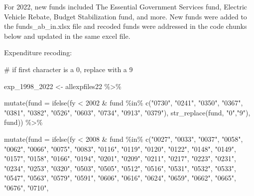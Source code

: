 \documentclass[
  letterpaper,
  DIV=11,
  numbers=noendperiod]{scrreport}
\newenvironment{Shaded}{\begin{snugshade}}{\end{snugshade}}
\newcommand{\AttributeTok}[1]{\textcolor[rgb]{0.40,0.45,0.13}{#1}}
\newcommand{\CommentTok}[1]{\textcolor[rgb]{0.37,0.37,0.37}{#1}}
\newcommand{\DecValTok}[1]{\textcolor[rgb]{0.68,0.00,0.00}{#1}}
\newcommand{\FunctionTok}[1]{\textcolor[rgb]{0.28,0.35,0.67}{#1}}
\newcommand{\NormalTok}[1]{\textcolor[rgb]{0.00,0.23,0.31}{#1}}
\newcommand{\OtherTok}[1]{\textcolor[rgb]{0.00,0.23,0.31}{#1}}
\newcommand{\SpecialCharTok}[1]{\textcolor[rgb]{0.37,0.37,0.37}{#1}}
\newcommand{\StringTok}[1]{\textcolor[rgb]{0.13,0.47,0.30}{#1}}
\begin{document}
For 2022, new funds included The Essential Government Services fund,
Electric Vehicle Rebate, Budget Stabilization fund, and more. New funds
were added to the funds\_ab\_in.xlsx file and recoded funds were
addressed in the code chunks below and updated in the same excel file.

Expenditure recoding:

\begin{Shaded}
\begin{Highlighting}[]
\CommentTok{\# if first character is a 0, replace with a 9}

\NormalTok{exp\_1998\_2022 }\OtherTok{\textless{}{-}}\NormalTok{ allexpfiles22 }\SpecialCharTok{\%\textgreater{}\%}

      \FunctionTok{mutate}\NormalTok{(}\AttributeTok{fund =} \FunctionTok{ifelse}\NormalTok{(fy }\SpecialCharTok{\textless{}} \DecValTok{2002} \SpecialCharTok{\&}\NormalTok{ fund }\SpecialCharTok{\%in\%} \FunctionTok{c}\NormalTok{(}\StringTok{"0730"}\NormalTok{, }\StringTok{"0241"}\NormalTok{, }\StringTok{"0350"}\NormalTok{, }\StringTok{"0367"}\NormalTok{, }\StringTok{"0381"}\NormalTok{, }\StringTok{"0382"}\NormalTok{, }\StringTok{"0526"}\NormalTok{, }\StringTok{"0603"}\NormalTok{, }\StringTok{"0734"}\NormalTok{, }\StringTok{"0913"}\NormalTok{, }\StringTok{"0379"}\NormalTok{), }\FunctionTok{str\_replace}\NormalTok{(fund, }\StringTok{"0"}\NormalTok{,}\StringTok{"9"}\NormalTok{), fund)) }\SpecialCharTok{\%\textgreater{}\%}

  \FunctionTok{mutate}\NormalTok{(}\AttributeTok{fund =} \FunctionTok{ifelse}\NormalTok{(fy }\SpecialCharTok{\textless{}} \DecValTok{2008} \SpecialCharTok{\&}\NormalTok{ fund }\SpecialCharTok{\%in\%} \FunctionTok{c}\NormalTok{(}\StringTok{"0027"}\NormalTok{, }\StringTok{"0033"}\NormalTok{, }\StringTok{"0037"}\NormalTok{, }\StringTok{"0058"}\NormalTok{, }\StringTok{"0062"}\NormalTok{, }\StringTok{"0066"}\NormalTok{, }\StringTok{"0075"}\NormalTok{, }\StringTok{"0083"}\NormalTok{, }\StringTok{"0116"}\NormalTok{, }\StringTok{"0119"}\NormalTok{, }\StringTok{"0120"}\NormalTok{, }\StringTok{"0122"}\NormalTok{, }\StringTok{"0148"}\NormalTok{, }\StringTok{"0149"}\NormalTok{, }\StringTok{"0157"}\NormalTok{, }\StringTok{"0158"}\NormalTok{, }\StringTok{"0166"}\NormalTok{, }\StringTok{"0194"}\NormalTok{, }\StringTok{"0201"}\NormalTok{, }\StringTok{"0209"}\NormalTok{, }\StringTok{"0211"}\NormalTok{, }\StringTok{"0217"}\NormalTok{, }\StringTok{"0223"}\NormalTok{, }\StringTok{"0231"}\NormalTok{, }\StringTok{"0234"}\NormalTok{, }\StringTok{"0253"}\NormalTok{, }\StringTok{"0320"}\NormalTok{, }\StringTok{"0503"}\NormalTok{, }\StringTok{"0505"}\NormalTok{, }\StringTok{"0512"}\NormalTok{, }\StringTok{"0516"}\NormalTok{, }\StringTok{"0531"}\NormalTok{, }\StringTok{"0532"}\NormalTok{, }\StringTok{"0533"}\NormalTok{, }\StringTok{"0547"}\NormalTok{, }\StringTok{"0563"}\NormalTok{, }\StringTok{"0579"}\NormalTok{, }\StringTok{"0591"}\NormalTok{, }\StringTok{"0606"}\NormalTok{, }\StringTok{"0616"}\NormalTok{, }\StringTok{"0624"}\NormalTok{, }\StringTok{"0659"}\NormalTok{, }\StringTok{"0662"}\NormalTok{, }\StringTok{"0665"}\NormalTok{, }\StringTok{"0676"}\NormalTok{, }\StringTok{"0710"}\NormalTok{, }


\end{Highlighting}
\end{Shaded}
\end{document}
